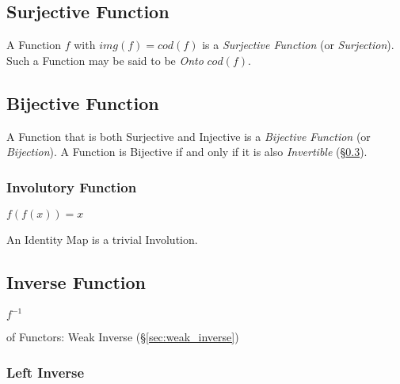 \subsection{Surjective Function}\label{sec:surjective_function}

A Function $f$ with $img(f) = cod(f)$ is a \emph{Surjective Function}
(or \emph{Surjection}). Such a Function may be said to be \emph{Onto}
$cod(f)$.



\subsection{Bijective Function}\label{sec:bijective_function}

A Function that is both Surjective and Injective is a \emph{Bijective
  Function} (or \emph{Bijection}). A Function is Bijective if and only
if it is also \emph{Invertible} (\S\ref{sec:inverse_function}).



\subsubsection{Involutory Function}\label{sec:involution}

$f(f(x)) = x$

An Identity Map is a trivial Involution.



\subsection{Inverse Function}\label{sec:inverse_function}

$f^{-1}$


of Functors: Weak Inverse (\S\ref{sec:weak_inverse})



\subsubsection{Left Inverse}\label{sec:left_inverse}

